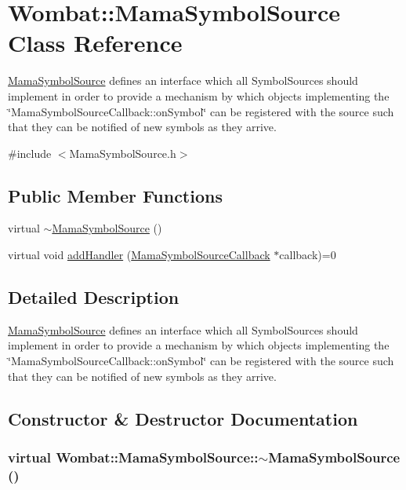\hypertarget{classWombat_1_1MamaSymbolSource}{
\section{Wombat::MamaSymbolSource Class Reference}
\label{classWombat_1_1MamaSymbolSource}
}


\hyperlink{classWombat_1_1MamaSymbolSource}{MamaSymbolSource} defines an interface which all SymbolSources should implement in order to provide a mechanism by which objects implementing the \char`\"{}MamaSymbolSourceCallback::onSymbol\char`\"{} can be registered with the source such that they can be notified of new symbols as they arrive.  


{\ttfamily \#include $<$MamaSymbolSource.h$>$}\subsection*{Public Member Functions}
\begin{DoxyCompactItemize}
\item 
virtual \hyperlink{classWombat_1_1MamaSymbolSource_a2af7a42ba8d021d6ff4e96089d10a68f}{$\sim$MamaSymbolSource} ()
\item 
virtual void \hyperlink{classWombat_1_1MamaSymbolSource_ab6ec8acbb7941fd0261f60536608a4fb}{addHandler} (\hyperlink{classWombat_1_1MamaSymbolSourceCallback}{MamaSymbolSourceCallback} $\ast$callback)=0
\end{DoxyCompactItemize}


\subsection{Detailed Description}
\hyperlink{classWombat_1_1MamaSymbolSource}{MamaSymbolSource} defines an interface which all SymbolSources should implement in order to provide a mechanism by which objects implementing the \char`\"{}MamaSymbolSourceCallback::onSymbol\char`\"{} can be registered with the source such that they can be notified of new symbols as they arrive. 

\subsection{Constructor \& Destructor Documentation}
\hypertarget{classWombat_1_1MamaSymbolSource_a2af7a42ba8d021d6ff4e96089d10a68f}{
\subsubsection[{$\sim$MamaSymbolSource}]{\setlength{\rightskip}{0pt plus 5cm}virtual Wombat::MamaSymbolSource::$\sim$MamaSymbolSource ()}}
\label{classWombat_1_1MamaSymbolSource_a2af7a42ba8d021d6ff4e96089d10a68f}


